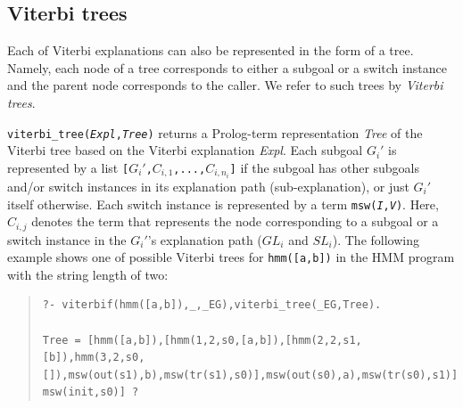 \documentclass[a4paper]{report}
\makeatletter
\let\tts@ve\tt
\def\tt{\tts@ve\ifmmode\def\_{\mathchar`\_}\else\def\_{\char`\_}\fi}
\def\index#1{%
  \@bsphack\begingroup
  \let\tt\tts@ve
  \def\protect##1{\string##1\space}\@sanitize
  \@wrindex{#1}}
\newcommand{\conindex}[1]{\index{concept}{#1}}
\makeatother
\begin{document}
\subsection{Viterbi trees}
\label{sec:built-in:viterbi:tree}

Each of Viterbi explanations can also be represented in the form of a tree.
Namely, each node of a tree corresponds to either a subgoal or a switch instance
and the parent node corresponds to the caller.  We refer to such trees by
{\it Viterbi trees}.\conindex{Viterbi tree}

{\tt viterbi\_tree({\it Expl},{\it Tree})} returns a Prolog-term representation
{\it Tree} of the Viterbi tree based on the Viterbi explanation {\it Expl}.
Each subgoal $G_i'$ is represented by a list {\tt [$G_i'$,$C_{i,1}$,...,$C_{i,n_i}$]}
if the subgoal has other subgoals and/or switch instances in its explanation path
(sub-explanation), or just $G_i'$ itself otherwise.  Each switch instance is
represented by a term {\tt msw({\it I},{\it V})}.  Here, $C_{i,j}$ denotes the term
that represents the node corresponding to a subgoal or a switch instance in the
$G_i'$'s explanation path ($\mathit{GL}_i$ and $\mathit{SL}_i$).  The following
example shows one of possible Viterbi trees for {\tt hmm([a,b])} in the HMM program
with the string length of two:
\begin{quote}
\begin{small}
\begin{verbatim}
?- viterbif(hmm([a,b]),_,_EG),viterbi_tree(_EG,Tree).

Tree = [hmm([a,b]),[hmm(1,2,s0,[a,b]),[hmm(2,2,s1,[b]),hmm(3,2,s0,
[]),msw(out(s1),b),msw(tr(s1),s0)],msw(out(s0),a),msw(tr(s0),s1)],
msw(init,s0)] ?
\end{verbatim}
\end{small}
\end{quote}
\end{document}
